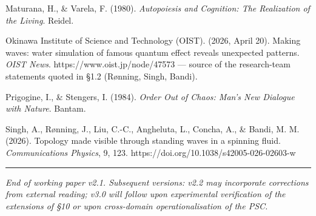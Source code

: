 \documentclass[
  11pt,
  a4paper,
]{article}
\begin{document}
Maturana, H., \& Varela, F. (1980). \emph{Autopoiesis and Cognition: The
Realization of the Living}. Reidel.

Okinawa Institute of Science and Technology (OIST). (2026, April 20).
Making waves: water simulation of famous quantum effect reveals
unexpected patterns. \emph{OIST News}. https://www.oist.jp/node/47573
--- source of the research-team statements quoted in §1.2 (Rønning,
Singh, Bandi).

Prigogine, I., \& Stengers, I. (1984). \emph{Order Out of Chaos: Man's
New Dialogue with Nature}. Bantam.

Singh, A., Rønning, J., Liu, C.-C., Angheluta, L., Concha, A., \& Bandi,
M. M. (2026). Topology made visible through standing waves in a spinning
fluid. \emph{Communications Physics}, 9, 123.
https://doi.org/10.1038/s42005-026-02603-w

\begin{center}\rule{0.5\linewidth}{0.5pt}\end{center}

\emph{End of working paper v2.1. Subsequent versions: v2.2 may
incorporate corrections from external reading; v3.0 will follow upon
experimental verification of the extensions of §10 or upon cross-domain
operationalisation of the PSC.}
\end{document}
